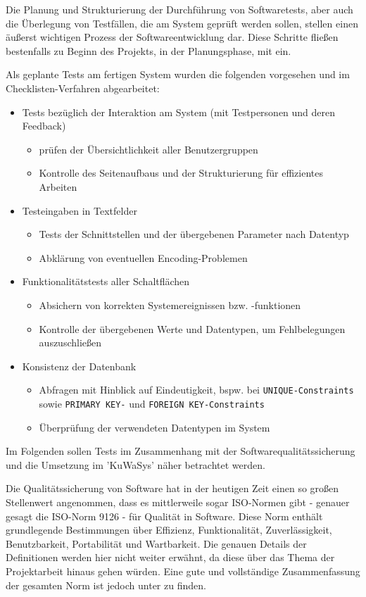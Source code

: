 Die Planung und Strukturierung der Durchführung von Softwaretests, aber auch die Überlegung von Testfällen, die am System geprüft werden sollen, stellen einen äußerst wichtigen Prozess der Softwareentwicklung dar.
Diese Schritte fließen bestenfalls zu Beginn des Projekts, in der Planungsphase, mit ein.

Als geplante Tests am fertigen System wurden die folgenden vorgesehen und im Checklisten-Verfahren abgearbeitet:
\begin{itemize}
	\item Tests bezüglich der Interaktion am System (mit Testpersonen und deren Feedback)
	\begin{itemize} 
		 \item prüfen der Übersichtlichkeit aller Benutzergruppen
		 \item Kontrolle des Seitenaufbaus und der Strukturierung für effizientes Arbeiten
	\end{itemize}
	\item Testeingaben in Textfelder
	\begin{itemize} 
		 \item Tests der Schnittstellen und der übergebenen Parameter nach Datentyp
		 \item Abklärung von eventuellen Encoding-Problemen
	\end{itemize}
	\item Funktionalitätstests aller Schaltflächen
	\begin{itemize} 
		 \item Absichern von korrekten Systemereignissen bzw. -funktionen
		 \item Kontrolle der übergebenen Werte und Datentypen, um Fehlbelegungen auszuschließen
	\end{itemize}
	\item Konsistenz der Datenbank 
	\begin{itemize} 
		 \item Abfragen mit Hinblick auf Eindeutigkeit, bspw. bei \texttt{UNIQUE-Constraints} sowie \texttt{PRIMARY KEY-} und \texttt{FOREIGN KEY-Constraints}
		 \item Überprüfung der verwendeten Datentypen im System
	\end{itemize}
\end{itemize}

Im Folgenden sollen Tests im Zusammenhang mit der Softwarequalitätssicherung und die Umsetzung im 'KuWaSys' näher betrachtet werden.

Die Qualitätssicherung von Software hat in der heutigen Zeit einen so großen Stellenwert angenommen, dass es mittlerweile sogar ISO-Normen gibt - genauer gesagt die ISO-Norm 9126 - für Qualität in Software. Diese Norm enthält grundlegende Bestimmungen über Effizienz, Funktionalität, Zuverlässigkeit, Benutzbarkeit, Portabilität und Wartbarkeit. 
Die genauen Details der Definitionen werden hier nicht weiter erwähnt, da diese über das Thema der Projektarbeit hinaus gehen würden. Eine gute und vollständige Zusammenfassung der gesamten Norm ist jedoch unter \cite{WikiISO9126} zu finden.

